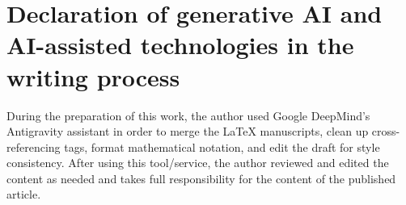 \documentclass[preprint,12pt]{elsarticle}
\theoremstyle{plain}
\theoremstyle{definition}
\theoremstyle{remark}
\begin{document}
    \section*{Declaration of generative AI and AI-assisted technologies in the writing process}

    During the preparation of this work, the author used Google DeepMind's Antigravity assistant in order to merge the LaTeX manuscripts, clean up cross-referencing tags, format mathematical notation, and edit the draft for style consistency. After using this tool/service, the author reviewed and edited the content as needed and takes full responsibility for the content of the published article.

    
    

    \appendix

    
\end{document}
